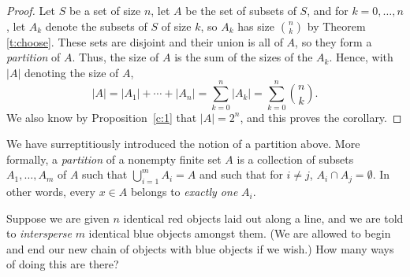 \documentclass[11pt,dvipsnames]{book}
\numberwithin{figure}{section} %
\numberwithin{table}{section} %
\begin{document}
\begin{proof}
Let $S$ be a set of size $n$, let $A$ be the set of subsets of $S$, and for $k=0, \dots ,n$, let $A_k$ denote the subsets of $S$ of size $k$, so $A_{k}$ has size ${n\choose k}$ by Theorem \ref{t:choose}. These sets are disjoint and their union is all of $A$, so they form a {\em partition} of $A$. Thus, the size of $A$ is the sum of the sizes of the $A_{k}$. Hence, with $|A|$ denoting the size of $A$,
\[|A|=|A_{1}|+\cdots + |A_{n}|= \sum_{k=0}^{n} |A_{k}|=\sum_{k=0}^{n}{n\choose k}.
\]
We also know by Proposition~\ref{c:1} that $|A|=2^{n}$, and this proves the corollary.
\end{proof}

We have surreptitiously introduced the notion of a partition above. More formally, a {\em partition} of a nonempty finite set $A$ is a collection of subsets $A_1, \dots , A_m$ of $A$ such that $\bigcup_{i=1}^m A_i = A$ and such that for $i \neq j$, $A_i \cap A_j = \emptyset$. In other words, every $x \in A$ belongs to {\em exactly one} $A_i$.

%
%

%

\bigskip
Suppose we are given $n$ identical red objects laid out along a line, and we are told to {\em intersperse} $m$ identical blue objects amongst them. (We are allowed to begin and end our new chain of objects with blue objects if we wish.) How many ways of doing this are there?
\end{document}
